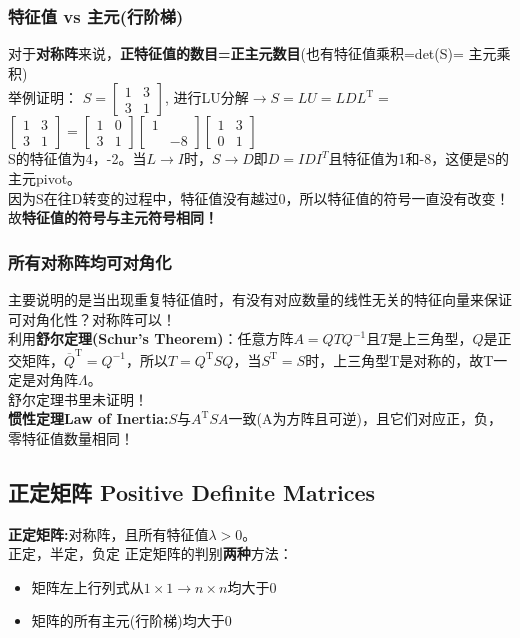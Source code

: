 \documentclass[UTF8]{article}
\begin{document}
    \subsubsection{特征值 vs 主元(行阶梯)}
    对于\textbf{对称阵}来说，\textbf{正特征值的数目=正主元数目}(也有特征值乘积=det(S)= 主元乘积)\\
    举例证明：
    $S = \left[\begin{array}{ll}{1} & {3} \\ {3} & {1}\end{array}\right]$, 进行LU分解$\rightarrow S=LU=L D L^{\mathrm{T}}=$$\left[\begin{array}{ll}{1} & {3} \\ {3} & {1}\end{array}\right]=\left[\begin{array}{ll}{1} & {0} \\ {3} & {1}\end{array}\right]\left[\begin{array}{ll}{1} \\ {} & {-8}\end{array}\right]\left[\begin{array}{ll}{1} & {3} \\ {0} & {1}\end{array}\right]$
    \\
    S的特征值为4，-2。当$L \rightarrow I$时，$S \rightarrow D$即$D = IDI^{T}$且特征值为1和-8，这便是S的主元pivot。
    \\
    因为S在往D转变的过程中，特征值没有越过0，所以特征值的符号一直没有改变！故\textbf{特征值的符号与主元符号相同！}

    \subsubsection{所有对称阵均可对角化}
    主要说明的是当出现重复特征值时，有没有对应数量的线性无关的特征向量来保证可对角化性？对称阵可以！
    \\
    利用\textbf{舒尔定理(Schur's Theorem)}：任意方阵$A=Q T Q^{-1}$且$T$是上三角型，$Q$是正交矩阵，$\overline{Q}^{\mathrm{T}}=Q^{-1}$，所以$T=Q^{\mathrm{T}} S Q$，当$S^{\mathrm{T}}=S$时，上三角型T是对称的，故T一定是对角阵$\Lambda$。
    \\
    舒尔定理书里未证明！\\
    \textbf{惯性定理Law of Inertia:}\quad $S$与$A^{\mathrm{T}} S A$一致(A为方阵且可逆)，且它们对应正，负，零特征值数量相同！

    \subsection{正定矩阵 Positive Definite Matrices}
    \textbf{正定矩阵:}对称阵，且所有特征值$\lambda >0$。\\
    正定，半定，负定
    正定矩阵的判别\textbf{两种}方法：
    \begin{itemize}
        \item 矩阵左上行列式从$1\times 1 \rightarrow n\times n$均大于0
        \item 矩阵的所有主元(行阶梯)均大于0
    \end{itemize}
\end{document}
